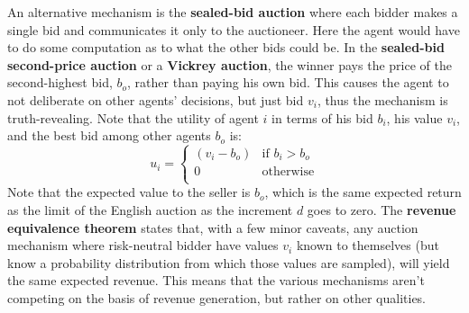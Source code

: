 \documentclass[twoside]{article}
\begin{document}
An alternative mechanism is the \textbf{sealed-bid auction} where each bidder 
makes a single bid and communicates it only to the auctioneer. Here the agent 
would have to do some computation as to what the other bids could be. In the 
\textbf{sealed-bid second-price auction} or a \textbf{Vickrey auction}, the 
winner pays the price of the second-highest bid, \(b_o\), rather than paying his
own bid. This causes the agent to not deliberate on other agents' decisions, but 
just bid \(v_i\), thus the mechanism is truth-revealing. Note that the utility 
of agent \(i\) in terms of his bid \(b_i\), his value \(v_i\), and the best bid
among other agents \(b_o\) is:
\begin{equation}
        u_i = 
        \begin{cases}
                (v_i - b_o) & \text{if } b_i > b_o \\
                0 & \text{otherwise} \\
        \end{cases}
\end{equation}
Note that the expected value to the seller is \(b_o\), which is the same expected
return as the limit of the English auction as the increment \(d\) goes to zero.
The \textbf{revenue equivalence theorem} states that, with a few minor caveats,
any auction mechanism where risk-neutral bidder have values \(v_i\) known to 
themselves (but know a probability distribution from which those values are 
sampled), will yield the same expected revenue. This means that the various 
mechanisms aren't competing on the basis of revenue generation, but rather on
other qualities.
\end{document}
